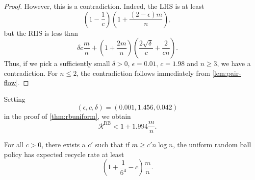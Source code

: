 \begin{proof}
However, this is a contradiction. Indeed, the LHS is at least 
$$
\left(1-\frac{1}{c}\right)\left(1+\frac{(2-\epsilon)m}{n}\right),
$$
but the RHS is less than
$$
\delta c \frac{m}{n} + \left(1+\frac{2m}{n}\right)\left(\frac{2\sqrt{\delta}}{c}+\frac{2}{cn}\right).
$$
Thus, if we pick a sufficiently small $\delta > 0$, $\epsilon = 0.01$, $c=1.98$
and $n\geq 3$, we have a contradiction. For $n \le 2$, the contradiction follows
immediately from \cref{lem:pair-flow}.
\end{proof}

\begin{corollary}\label{cor:rbuni-upper-constants}
	Setting
	\begin{equation*}
		(\epsilon, c, \delta) = (0.001, 1.456, 0.042)
	\end{equation*}
	in the proof of \cref{thm:rbuniform}, we obtain 
	\begin{equation*}
		\mathcal{R}^\textrm{RB} < 1 + 1.994\frac{m}{n}.
	\end{equation*}
\end{corollary}

\begin{lemma}\label{lem:rbuni-lower} For all $c > 0$, there exists a
  $c'$ such that if $m \ge c' n\log n$, the uniform random ball policy
  has expected recycle rate at least   
$$
 	\left(1+\frac{1}{6^4} - c\right)\frac{m}{n}.
$$
\end{lemma}

